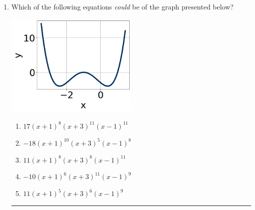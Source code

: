 \documentclass[14pt]{extbook}
\newcommand{\litem}[1]{\item#1\hspace*{-1cm}\rule{\textwidth}{0.4pt}}
\begin{document}
\begin{enumerate}
{\begin{enumerate}[label=\Alph*.]
\end{enumerate} }
\litem{
Which of the following equations \textit{could} be of the graph presented below?
\begin{center}
    \includegraphics[width=0.5\textwidth]{../Figures/polyGraphToFunctionB.png}
\end{center}
\begin{enumerate}[label=\Alph*.]
\item \( 17(x + 1)^{8} (x + 3)^{11} (x - 1)^{11} \)
\item \( -18(x + 1)^{10} (x + 3)^{5} (x - 1)^{8} \)
\item \( 11(x + 1)^{8} (x + 3)^{8} (x - 1)^{11} \)
\item \( -10(x + 1)^{6} (x + 3)^{11} (x - 1)^{9} \)
\item \( 11(x + 1)^{5} (x + 3)^{6} (x - 1)^{9} \)


\end{enumerate}}
\end{enumerate}
\end{document}
